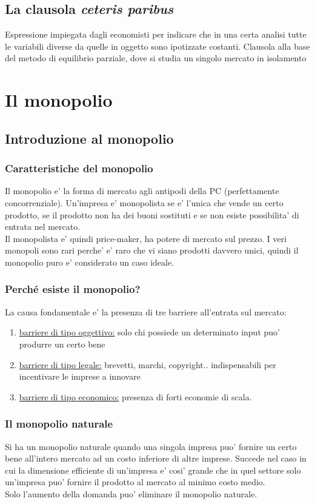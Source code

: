 \documentclass{report}
\begin{document}
	\section{La clausola \textit{ceteris paribus}}
	Espressione impiegata dagli economisti per indicare che in una certa analisi tutte le variabili diverse da quelle in oggetto sono ipotizzate costanti. Clausola alla base del metodo di equilibrio parziale, dove si studia un singolo mercato in isolamento
	
	\chapter{Il monopolio}
	\section{Introduzione al monopolio}
	\subsection{Caratteristiche del monopolio}
	Il monopolio e' la forma di mercato agli antipodi della PC (perfettamente concorrenziale). Un'impresa e' monopolista se e' l'unica che vende un certo prodotto, se il prodotto non ha dei buoni sostituti e se non esiste possibilita' di entrata nel mercato.
	\medskip \\Il monopolista e' quindi price-maker, ha potere di mercato sul prezzo. I veri monopoli sono rari perche' e' raro che vi siano prodotti davvero unici, quindi il monopolio puro e' considerato un caso ideale.
	\subsection{Perché esiste il monopolio?}
	La causa fondamentale e' la presenza di tre barriere all'entrata sul mercato:
	\begin{enumerate}
		\item \underline{barriere di tipo oggettivo:} solo chi possiede un determinato input puo' produrre un certo bene
		\item \underline{barriere di tipo legale:} brevetti, marchi, copyright.. indispensabili per incentivare le imprese a innovare
		\item \underline{barriere di tipo economico:} presenza di forti economie di scala.
	\end{enumerate}
	\subsection{Il monopolio naturale}
	Si ha un monopolio naturale quando una singola impresa puo' fornire un certo bene all'intero mercato ad un costo inferiore di altre imprese. Succede nel caso in cui la dimensione efficiente di un'impresa e' cosi' grande che in quel settore solo un'impresa puo' fornire il prodotto al mercato al minimo costo medio.
	\medskip \\Solo l'aumento della domanda puo' eliminare il monopolio naturale.
\end{document}
